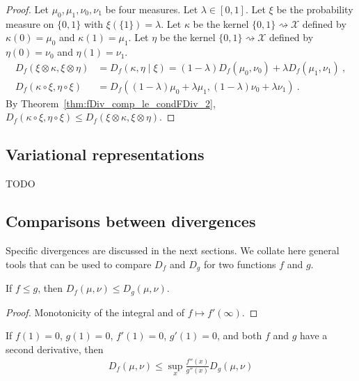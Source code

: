 \begin{proof}
Let $\mu_0, \mu_1, \nu_0, \nu_1$ be four measures. Let $\lambda \in [0,1]$. Let $\xi$ be the probability measure on $\{0,1\}$ with $\xi(\{1\}) = \lambda$.
Let $\kappa$ be the kernel $\{0,1\} \rightsquigarrow \mathcal X$ defined by $\kappa(0) = \mu_0$ and $\kappa(1) = \mu_1$.
Let $\eta$ be the kernel $\{0,1\} \rightsquigarrow \mathcal X$ defined by $\eta(0) = \nu_0$ and $\eta(1) = \nu_1$.
\begin{align*}
D_f(\xi \otimes \kappa, \xi \otimes \eta)
&= D_f(\kappa, \eta \mid \xi)
= (1 - \lambda) D_f(\mu_0, \nu_0) + \lambda D_f(\mu_1, \nu_1)
\: , \\
D_f(\kappa \circ \xi, \eta \circ \xi)
&= D_f((1 - \lambda)\mu_0 + \lambda \mu_1, (1 - \lambda)\nu_0 + \lambda \nu_1)
\: .
\end{align*}
By Theorem~\ref{thm:fDiv_comp_le_condFDiv_2}, $D_f(\kappa \circ \xi, \eta \circ \xi) \le D_f(\xi \otimes \kappa, \xi \otimes \eta)$.
\end{proof}



\subsection{Variational representations}

TODO




\subsection{Comparisons between divergences}

Specific divergences are discussed in the next sections. We collate here general tools that can be used to compare $D_f$ and $D_g$ for two functions $f$ and $g$.

\begin{lemma}
  \label{lem:fDiv_mono_fun}
  If $f \le g$, then $D_f(\mu, \nu) \le D_g(\mu, \nu)$.
\end{lemma}

\begin{proof}
Monotonicity of the integral and of $f \mapsto f'(\infty)$.
\end{proof}


\begin{lemma}
  \label{lem:fDiv_le_of_deriv2_le}
  If $f(1) = 0$, $g(1) = 0$, $f'(1) = 0$, $g'(1) = 0$, and both $f$ and $g$ have a second derivative, then
  \begin{align*}
  D_f(\mu, \nu) \le \sup_x \frac{f''(x)}{g''(x)} D_g(\mu, \nu)
  \end{align*}
\end{lemma}

